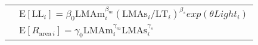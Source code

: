 \documentclass[
  12pt,
]{article}
\providecommand{\DIFaddbegin}{} %
\providecommand{\DIFaddend}{} %
\providecommand{\DIFdelbegin}{} %
\providecommand{\DIFdelend}{} %
\newcommand{\DIFscaledelfig}{0.5}
\newlength{\DIFdelgraphicswidth} %
\newlength{\DIFdelgraphicsheight} %
\newcommand{\DIFaddincludegraphics}[2][]{{\color{blue}\fbox{\DIFOincludegraphics[#1]{#2}}}} %
\newcommand{\DIFdelincludegraphics}[2][]{%
\sbox{\DIFdelgraphicsbox}{\DIFOincludegraphics[#1]{#2}}%
\settoboxwidth{\DIFdelgraphicswidth}{\DIFdelgraphicsbox} %
\settoboxtotalheight{\DIFdelgraphicsheight}{\DIFdelgraphicsbox} %
\scalebox{\DIFscaledelfig}{%
\parbox[b]{\DIFdelgraphicswidth}{\usebox{\DIFdelgraphicsbox}\\[-\baselineskip] \rule{\DIFdelgraphicswidth}{0em}}\llap{\resizebox{\DIFdelgraphicswidth}{\DIFdelgraphicsheight}{%
\setlength{\unitlength}{\DIFdelgraphicswidth}%
\begin{picture}(1,1)%
\thicklines\linethickness{2pt} %
{\color[rgb]{1,0,0}\put(0,0){\framebox(1,1){}}}%
{\color[rgb]{1,0,0}\put(0,0){\line( 1,1){1}}}%
{\color[rgb]{1,0,0}\put(0,1){\line(1,-1){1}}}%
\end{picture}%
}\hspace*{3pt}}} %
} %
\DeclareRobustCommand{\DIFaddbegin}{\DIFOaddbegin \let\includegraphics\DIFaddincludegraphics} %
\DeclareRobustCommand{\DIFaddend}{\DIFOaddend \let\includegraphics\DIFOincludegraphics} %
\DeclareRobustCommand{\DIFdelbegin}{\DIFOdelbegin \let\includegraphics\DIFdelincludegraphics} %
\DeclareRobustCommand{\DIFdelend}{\DIFOaddend \let\includegraphics\DIFOincludegraphics} %
\begin{document}
\begin{longtable}[]{@{}
  >{\raggedright\arraybackslash}p{}
  >{\raggedright\arraybackslash}p{}@{}}
\DIFdelend \DIFaddbegin \\
\DIFaddend & \DIFdelbegin %
\DIFdelend \(\mathrm{E}[\mathrm{LL}_i] = \beta_0\mathrm{LMAm}_{i}^{\beta_m} (\mathrm{LMAs}_{i}/\mathrm{LT}_{i})^{\beta_s}exp(\theta Light_i)\) \DIFdelbegin %
\DIFdelend \DIFaddbegin \\
\DIFaddend & \DIFdelbegin %
\DIFdelend \(\mathrm{E}[R_{\mathrm{area} \, i}] = \gamma_0\mathrm{LMAm}_{i}^{\gamma_m} \mathrm{LMAs}_{i}^{\gamma_s}\) \DIFdelbegin %
\DIFdelend \DIFaddbegin \\
\DIFaddend \bottomrule
\end{longtable}

\newpage

\hypertarget{section}{%
\section{}\label{section}}
\end{document}
